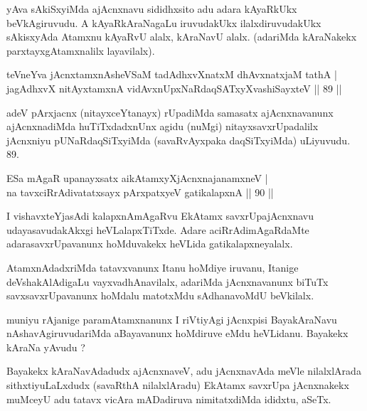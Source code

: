 \begin{artha}
yAva sAkiSxyiMda ajAcnxnavu sididhxsito adu adara kAyaRkUkx beVkAgiruvudu. A kAyaRkAraNagaLu iruvudakUkx ilalxdiruvudakUkx sAkisxyAda Atamxnu kAyaRvU alalx, kAraNavU alalx. (adariMda kAraNakekx parxtayxgAtamxnalilx layavilalx). 
\end{artha}

\begin{shl}
teVneYva jAcnxtamxnA\s sheVSaM tadAdhxvXnatxM dhAvxnatxjaM tathA |\\
jagAdhxvX nitAyxtamxnA vidAvxnUpxNaRdaqSATxyX\s vashiSayxteV \hfill || 89 || 
\end{shl}

\begin{artha}
adeV pArxjacnx (nitayxceYtanayx) rUpadiMda samasatx ajAcnxnavanunx ajAcnxnadiMda huTiTxdadxnUnx agidu (nuMgi) nitayxsavxrUpadalilx jAcnxniyu pUNaRdaqSiTxyiMda (savaRvAyxpaka daqSiTxyiMda) uLiyuvudu. 89.
\end{artha}


\begin{shl}
ESa mAgaR upanayxsatx aikAtamxyXjAcnxnajanamxneV |\\
na tavxciRrAdivatatxsayx pArxpatxyeV gatikalapxnA \hfill || 90 || 
\end{shl}

\begin{artha}
I vishavxteYjasAdi kalapxnAmAgaRvu EkAtamx savxrUpajAcnxnavu udayasavudakAkxgi heVLalapxTiTxde. Adare aciRrAdimAgaRdaMte adarasavxrUpavanunx hoMduvakekx heVLida gatikalapxneyalalx.
\end{artha}

\begin{artha}
AtamxnAdadxriMda tatavxvanunx Itanu hoMdiye iruvanu, Itanige deVshakAlAdigaLu vayxvadhAnavilalx, adariMda jAcnxnavanunx biTuTx savxsavxrUpavanunx hoMdalu matotxMdu sAdhanavoMdU beVkilalx.
\end{artha}

\begin{artha}
muniyu rAjanige paramAtamxnanunx I riVtiyAgi jAcnxpisi BayakAraNavu nAshavAgiruvudariMda aBayavanunx hoMdiruve eMdu heVLidanu. Bayakekx kAraNa yAvudu ?
\end{artha}

\begin{artha}
Bayakekx kAraNavAdadudx ajAcnxnaveV, adu jAcnxnavAda meVle nilalxlArada sithxtiyuLaLxdudx (savaRthA nilalxlAradu) EkAtamx savxrUpa jAcnxnakekx muMceyU adu tatavx vicAra mADadiruva nimitatxdiMda ididxtu, aSeTx.
\end{artha}

